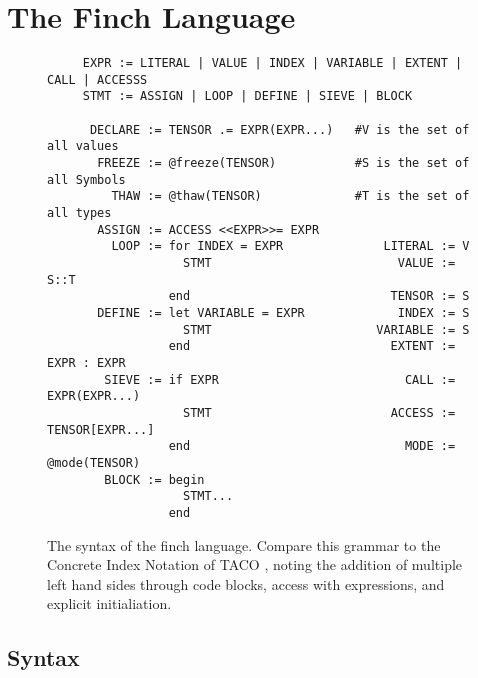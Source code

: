 
\section{The Finch Language}


\begin{wrapfigure}{r}{0.51\linewidth}
    \vspace{-26pt}
    \begin{verbatim}
     EXPR := LITERAL | VALUE | INDEX | VARIABLE | EXTENT | CALL | ACCESSS
     STMT := ASSIGN | LOOP | DEFINE | SIEVE | BLOCK

      DECLARE := TENSOR .= EXPR(EXPR...)   #V is the set of all values
       FREEZE := @freeze(TENSOR)           #S is the set of all Symbols
         THAW := @thaw(TENSOR)             #T is the set of all types                                      
       ASSIGN := ACCESS <<EXPR>>= EXPR    
         LOOP := for INDEX = EXPR              LITERAL := V                           
                   STMT                          VALUE := S::T                        
                 end                            TENSOR := S                            
       DEFINE := let VARIABLE = EXPR             INDEX := S                            
                   STMT                       VARIABLE := S                            
                 end                            EXTENT := EXPR : EXPR                  
        SIEVE := if EXPR                          CALL := EXPR(EXPR...)                
                   STMT                         ACCESS := TENSOR[EXPR...]              
                 end                              MODE := @mode(TENSOR)                
        BLOCK := begin                     
                   STMT...                 
                 end                        
    \end{verbatim}                                                   
    \vspace{-12pt}
\caption{The syntax of the finch language. Compare this grammar to the Concrete
Index Notation of TACO \cite[Figure~3]{kjolstad_tensor_2019}, noting the
addition of multiple left hand sides through code blocks, access with expressions, and explicit initialiation.}\label{fig:syntax}

\end{wrapfigure}

\subsection{Syntax}

